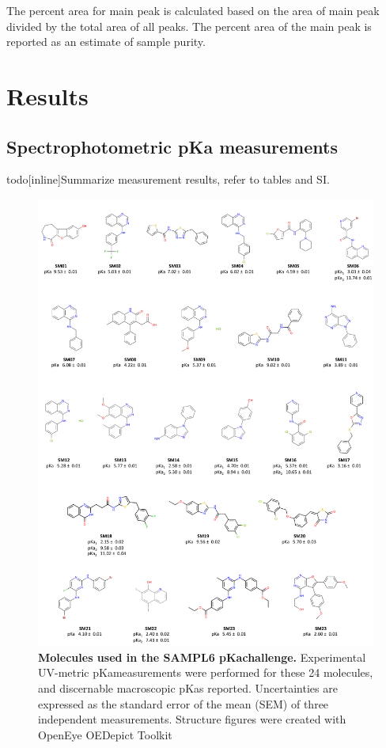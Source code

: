 \documentclass[9pt,lineno]{elife}
\newcommand{\pKa}{pKa}
\begin{document}
The percent area for main peak is calculated based on the area of main peak divided by the total area of all peaks. The percent area of the main peak is reported as an estimate of sample purity.

\section{Results}

\subsection{Spectrophotometric pKa measurements}
todo[inline]{Summarize measurement results, refer to tables and SI.}

\begin{figure}
\includegraphics[width=0.95\linewidth]{figures/SAMPL6_pKa_molecules_fig}
\caption{{\bf Molecules used in the SAMPL6 \pKa  challenge.} 
Experimental UV-metric \pKa measurements were performed for these 24 molecules, and discernable macroscopic {\pKa}s reported. 
Uncertainties are expressed as the standard error of the mean (SEM) of three independent measurements. Structure figures were created with OpenEye OEDepict Toolkit ~\citep{oedepict_openeye_2017}
}
\label{fig:pKa_molecules}
\end{figure}
\end{document}
